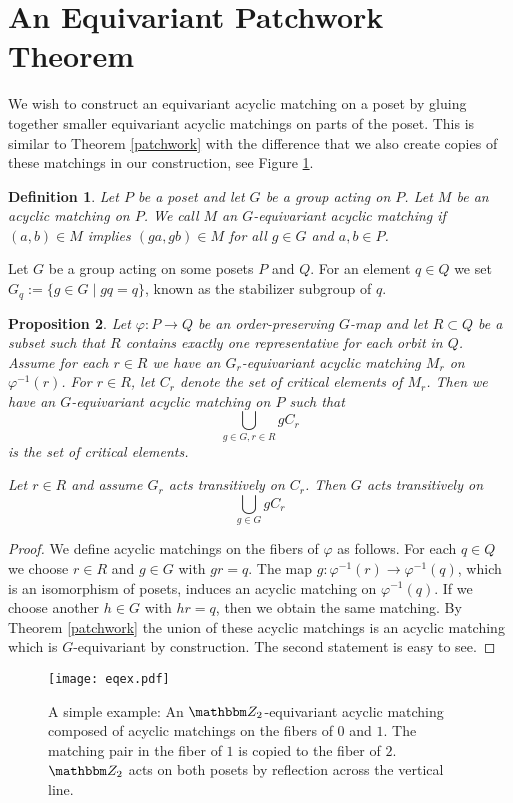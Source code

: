 \documentclass{elsarticle}
\newtheorem{df}{Definition}[section]
\newtheorem{prop}[df]{Proposition}
\def\Z{\mathbbm Z}
\begin{document}
\section{An Equivariant Patchwork Theorem}
We wish to construct an equivariant acyclic matching on a poset by gluing together smaller equivariant acyclic matchings on parts of the poset. This is similar to Theorem \ref{patchwork} with the difference that we also create copies of these matchings in our construction, see Figure \ref{eqex}.
\begin{df}
Let $P$ be a poset and let $G$ be a group acting on $P$. Let $M$ be an acyclic matching on $P$. We call $M$ an \emph{$G$-equivariant acyclic matching} if $(a,b)\in M$ implies $(ga,gb)\in M$ for all $g\in G$ and $a,b\in P$.
\end{df}
Let $G$ be a group acting on some posets $P$ and $Q$. For an element $q\in Q$ we set $G_q:=\{g\in G\mid gq=q\}$, known as the stabilizer subgroup of $q$.
\begin{prop}
\label{eqpatchwork}
Let $\varphi:P\longrightarrow Q$ be an order-preserving $G$-map and let $R\subset Q$ be a subset such that $R$ contains exactly one representative for each orbit in $Q$. Assume for each $r\in R$ we have an $G_r$-equivariant acyclic matching $M_r$ on $\varphi^{-1}(r)$. For $r\in R$, let $C_r$ denote the set of critical elements of $M_r$. Then we have an $G$-equivariant acyclic matching on $P$ such that
\[
\bigcup_{g\in G, r\in R}gC_r
\]
is the set of critical elements.

Let $r\in R$ and assume $G_r$ acts transitively on $C_r$. Then $G$ acts transitively on
\[
\bigcup_{g\in G}gC_r
\]
\end{prop}
\begin{proof}
We define acyclic matchings on the fibers of $\varphi$ as follows. For each $q\in Q$ we choose $r\in R$ and $g\in G$ with $gr=q$. The map $g:\varphi^{-1}(r)\longrightarrow\varphi^{-1}(q)$, which is an isomorphism of posets, induces an acyclic matching on $\varphi^{-1}(q)$. If we choose another $h\in G$ with $hr=q$, then we obtain the same matching. By Theorem \ref{patchwork} the union of these acyclic matchings is an acyclic matching which is $G$-equivariant by construction. The second statement is easy to see.
\end{proof}
\begin{figure}[ht]
\centering
\texttt{[image: eqex.pdf]}
\caption{A simple example: An $\Z_2$-equivariant acyclic matching composed of acyclic matchings on the fibers of $0$ and $1$. The matching pair in the fiber of $1$ is copied to the fiber of $2$. $\Z_2$ acts on both posets by reflection across the vertical line.}
\label{eqex}
\end{figure}
\end{document}
